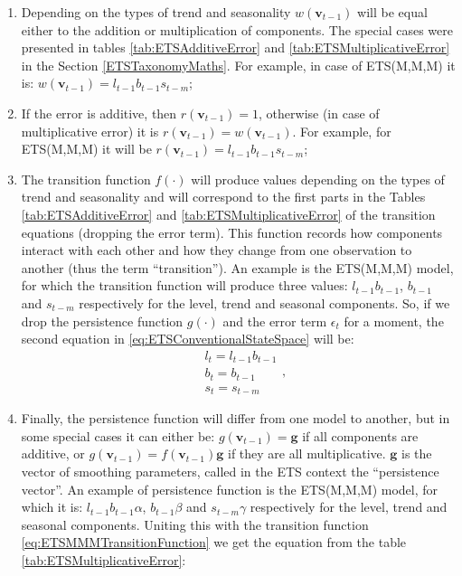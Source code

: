 \documentclass[
]{book}
\providecommand{\tightlist}{%
  \setlength{\itemsep}{0pt}\setlength{\parskip}{0pt}}
\theoremstyle{definition}
\theoremstyle{definition}
\theoremstyle{definition}
\theoremstyle{definition}
\theoremstyle{remark}
\begin{document}
\begin{enumerate}
\def\labelenumi{\arabic{enumi}.}
\tightlist
\item
  Depending on the types of trend and seasonality \(w(\mathbf{v}_{t-1})\) will be equal either to the addition or multiplication of components. The special cases were presented in tables \ref{tab:ETSAdditiveError} and \ref{tab:ETSMultiplicativeError} in the Section \ref{ETSTaxonomyMaths}. For example, in case of ETS(M,M,M) it is: \(w(\mathbf{v}_{t-1}) = l_{t-1} b_{t-1} s_{t-m}\);
\item
  If the error is additive, then \(r(\mathbf{v}_{t-1})=1\), otherwise (in case of multiplicative error) it is \(r(\mathbf{v}_{t-1})=w(\mathbf{v}_{t-1})\). For example, for ETS(M,M,M) it will be \(r(\mathbf{v}_{t-1}) = l_{t-1} b_{t-1} s_{t-m}\);
\item
  The transition function \(f(\cdot)\) will produce values depending on the types of trend and seasonality and will correspond to the first parts in the Tables \ref{tab:ETSAdditiveError} and \ref{tab:ETSMultiplicativeError} of the transition equations (dropping the error term). This function records how components interact with each other and how they change from one observation to another (thus the term ``transition''). An example is the ETS(M,M,M) model, for which the transition function will produce three values: \(l_{t-1}b_{t-1}\), \(b_{t-1}\) and \(s_{t-m}\) respectively for the level, trend and seasonal components. So, if we drop the persistence function \(g(\cdot)\) and the error term \(\epsilon_t\) for a moment, the second equation in \eqref{eq:ETSConventionalStateSpace} will be:
  \begin{equation}
    \begin{aligned}
    & {l}_{t} = l_{t-1} b_{t-1} \\
    & b_t = b_{t-1} \\
    & s_t = s_{t-m}
    \end{aligned},
    \label{eq:ETSMMMTransitionFunction}
  \end{equation}
\item
  Finally, the persistence function will differ from one model to another, but in some special cases it can either be: \(g(\mathbf{v}_{t-1})=\mathbf{g}\) if all components are additive, or \(g(\mathbf{v}_{t-1})=f(\mathbf{v}_{t-1})\mathbf{g}\) if they are all multiplicative. \(\mathbf{g}\) is the vector of smoothing parameters, called in the ETS context the ``persistence vector''. An example of persistence function is the ETS(M,M,M) model, for which it is: \(l_{t-1}b_{t-1}\alpha\), \(b_{t-1}\beta\) and \(s_{t-m}\gamma\) respectively for the level, trend and seasonal components. Uniting this with the transition function \eqref{eq:ETSMMMTransitionFunction} we get the equation from the table \ref{tab:ETSMultiplicativeError}:

\end{enumerate}
\end{document}
